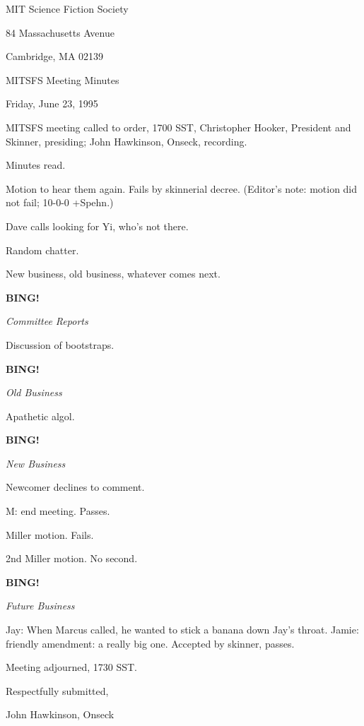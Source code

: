 \documentclass[12pt]{article}
\newcommand{\bing}{{\bf BING!} }
\newcommand{\goto}[1]{\bing \vskip 12pt \centerline{{\em{#1}}}}
\begin{document}
\begin{center}

MIT Science Fiction Society 

84 Massachusetts Avenue

Cambridge, MA 02139

\vspace{12pt}

MITSFS Meeting Minutes 

Friday, June 23, 1995

\end{center}
 
\vspace{18pt}

\setlength{\parskip}{6pt}

\noindent
MITSFS meeting called to order, 1700 SST,
Christopher Hooker, President and Skinner, presiding; John Hawkinson, Onseck, recording.

Minutes read.

Motion to hear them again. Fails by skinnerial decree. (Editor's note: motion did not fail; 10-0-0 +Spehn.)

Dave calls looking for Yi, who's not there.

Random chatter.

New business, old business, whatever comes next.

\goto{Committee Reports}

Discussion of bootstraps.

\goto{Old Business}

Apathetic algol.

\goto{New Business}

Newcomer declines to comment.

M: end meeting. Passes.

Miller motion. Fails.

2nd Miller motion. No second.

\goto{Future Business}

Jay: When Marcus called, he wanted to stick a banana down Jay's throat. Jamie: friendly amendment: a really big one. Accepted by skinner, passes.

\vspace{12pt}

\noindent
Meeting adjourned, 1730 SST.

\vspace{18pt}

\centerline{Respectfully submitted,}
\centerline{John Hawkinson, Onseck}
\end{document}

